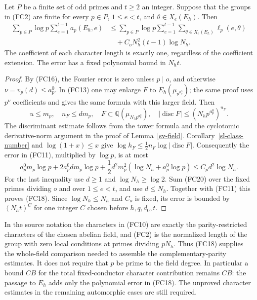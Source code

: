 \begin{theorem}\label{fcmp-uniform}
Let $P$ be a finite set of odd primes and $t\ge2$ an integer.
Suppose that the groups in (FC2) are finite for every
$p\in P$, $1\le e<t$, and $\theta\in X_e(E_h)$. Then
\[
 \begin{split}
 \sum_{p\in P}\log p\sum_{e=1}^{t-1}a_p(E_h,e)
 &\le
 \sum_{p\in P}\log p\sum_{e=1}^{t-1}
                    \sum_{\theta\in X_e(E_h)}\ell_p(e,\theta)\\
 &\quad+C_o N_h^2(t-1)\log N_h .
 \end{split}                                                   \tag{FC18}
\]
The coefficient of each character length is exactly one,
regardless of the coefficient extension. The error has
a fixed polynomial bound in $N_ht$.
\end{theorem}
\begin{proof}
By (FC16), the Fourier error is zero unless $p\mid o$,
and otherwise $\nu=v_p(d)\le a_p^0$. In (FC13) one may
enlarge $F$ to $E_h(\mu_{p^{a_p^0}})$; the same proof
uses $p^\nu$ coefficients and gives the same formula
with this larger field. Then
\[
 u\le m_p,\quad n_F\le dm_p,\quad
 F\subset\mathbb Q(\mu_{N_hp^{a_p^0}}),\quad
 |\operatorname{disc}F|
                 \le (N_hp^{a_p^0})^{n_F}.                     \tag{FC19}
\]
The discriminant estimate follows from the tower formula
and the cyclotomic derivative-norm argument in the proof
of Lemma~\ref{sv-field}.
Corollary~\ref{sl-class-number} and $\log(1+x)\le x$ give
$\log h_F\le \tfrac12 n_F\log|\operatorname{disc}F|$.
Consequently the error in (FC11), multiplied by $\log p$,
is at most
\[
 a_p^0m_p\log p+2a_p^0dm_p\log p
            +\frac12d^2m_p^2(\log N_h+a_p^0\log p)
 \le C_p d^2\log N_h .
                                                               \tag{FC20}
\]
For the last inequality use $d\ge1$ and $\log N_h\ge\log2$.
Sum (FC20) over the fixed primes dividing $o$ and over
$1\le e<t$, and use $d\le N_h$. Together with (FC11)
this proves (FC18). Since $\log N_h\le N_h$ and $C_o$
is fixed, its error is bounded by $(N_ht)^C$ for one
integer $C$ chosen before $h,q,d_0,t$.
\end{proof}

In the source notation the characters in (FC10) are
exactly the parity-restricted characters of the chosen
abelian field, and (FC2) is the normalized length of
the group with zero local conditions at primes dividing
$pN_h$.\cite{alpo-uniform-source}
Thus (FC18) supplies the whole-field comparison needed
to assemble the complementary-parity estimates.
It does not require that $p$ be prime to the field
degree. In particular a bound $CB$ for the total
fixed-conductor character contribution remains $CB$:
the passage to $E_h$ adds only the polynomial error
in (FC18). The unproved character estimates in the
remaining automorphic cases are still required.


